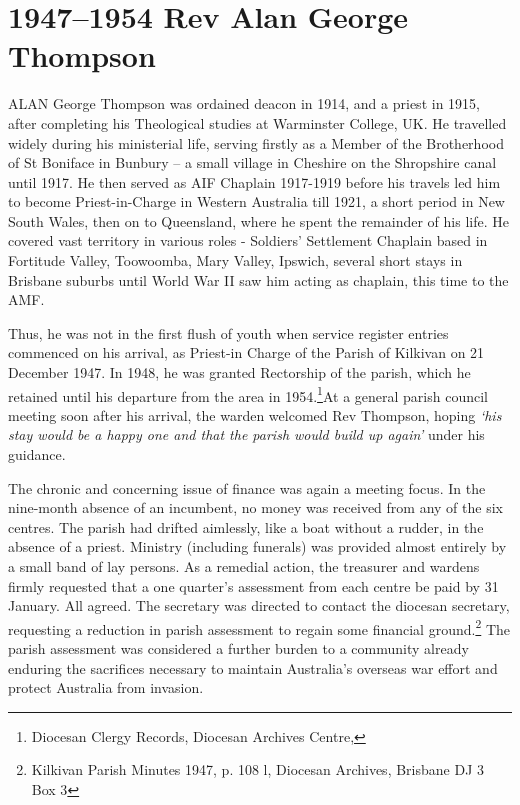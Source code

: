 \balance


\printendnotes[custom]
\setcounter{endnote}{0}
\chapter{1947--1954 Rev Alan George Thompson}
\nobalance


\lettrine[lines=3]{A}{LAN}
 George Thompson was ordained deacon in 1914, and a priest in 1915, after completing his Theological studies at Warminster College, UK. He travelled widely during his ministerial life, serving firstly as a Member of the Brotherhood of St Boniface in Bunbury -- a small village in Cheshire on the Shropshire canal until 1917. He then served as AIF Chaplain 1917-1919 before his travels led him to become Priest-in-Charge in Western Australia till 1921, a short period in New South Wales, then on to Queensland, where he spent the remainder of his life. He covered vast territory in various roles - Soldiers' Settlement Chaplain based in Fortitude Valley, Toowoomba, Mary Valley, Ipswich, several short stays in Brisbane suburbs until World War II saw him acting as chaplain, this time to the AMF.

Thus, he was not in the first flush of youth when service register entries commenced on his arrival, as Priest-in Charge of the Parish of Kilkivan on 21 December 1947. In 1948, he was granted Rectorship of the parish, which he retained until his departure from the area in 1954.\footnote{Diocesan Clergy Records, Diocesan Archives Centre,}At a general parish council meeting soon after his arrival, the warden welcomed Rev Thompson, hoping \emph{`his stay would be a happy one and that the parish would build up again'} under his guidance.


The chronic and concerning issue of finance was again a meeting focus. In the nine-month absence of an incumbent, no money was received from any of the six centres. The parish had drifted aimlessly, like a boat without a rudder, in the absence of a priest. Ministry (including funerals) was provided almost entirely by a small band of lay persons. As a remedial action, the treasurer and wardens firmly requested that a one quarter's assessment from each centre be paid by 31 January. All agreed. The secretary was directed to contact the diocesan secretary, requesting a reduction in parish assessment to regain some financial ground.\footnote{Kilkivan Parish Minutes 1947, p. 108 l, Diocesan Archives, Brisbane DJ 3 Box 3} The parish assessment was considered a further burden to a community already enduring the sacrifices necessary to maintain Australia's overseas war effort and protect Australia from invasion.


